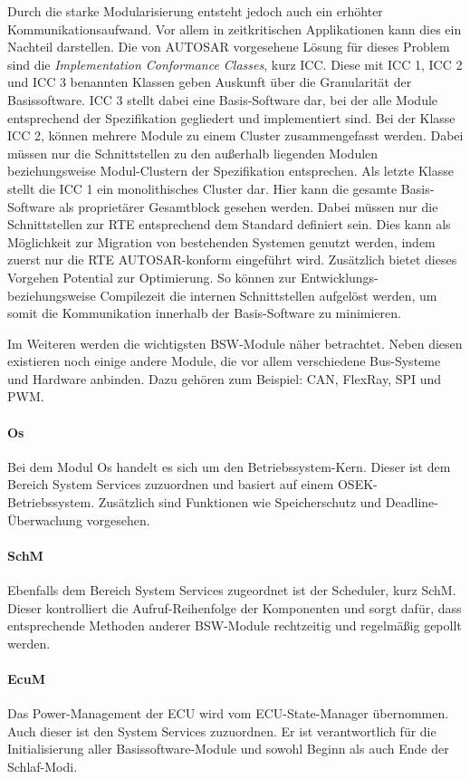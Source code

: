 \documentclass[
  a4paper,					    %
  twoside,
  DIV=calc,     				%
  bibliography=totoc,
  cleardoublepage=empty,
  ngerman,     					%
  final       					%
]{scrbook}
\begin{document}
Durch die starke Modularisierung entsteht jedoch auch ein erhöhter Kommunikationsaufwand. Vor allem in zeitkritischen Applikationen kann dies ein Nachteil darstellen. Die von AUTOSAR vorgesehene Lösung für dieses Problem sind die \emph{Implementation Conformance Classes}, kurz ICC. Diese mit ICC 1, ICC 2 und ICC 3 benannten Klassen geben Auskunft über die Granularität der Basissoftware. ICC 3 stellt dabei eine Basis-Software dar, bei der alle Module entsprechend der Spezifikation gegliedert und implementiert sind. Bei der Klasse ICC 2, können mehrere Module zu einem Cluster zusammengefasst werden. Dabei müssen nur die Schnittstellen zu den außerhalb liegenden Modulen beziehungsweise Modul-Clustern der Spezifikation entsprechen. Als letzte Klasse stellt die ICC 1 ein monolithisches Cluster dar. Hier kann die gesamte Basis-Software als proprietärer Gesamtblock gesehen werden. Dabei müssen nur die Schnittstellen zur RTE entsprechend dem Standard definiert sein. Dies kann als Möglichkeit zur Migration von bestehenden Systemen genutzt werden, indem zuerst nur die RTE AUTOSAR-konform eingeführt wird. Zusätzlich bietet dieses Vorgehen Potential zur Optimierung. So können zur Entwicklungs- beziehungsweise Compilezeit die internen Schnittstellen aufgelöst werden, um somit die Kommunikation innerhalb der Basis-Software zu minimieren.

Im Weiteren werden die wichtigsten BSW-Module näher betrachtet\cite{SE_Autosar}. Neben diesen existieren noch einige andere Module, die vor allem verschiedene Bus-Systeme und Hardware anbinden. Dazu gehören zum Beispiel: CAN, FlexRay, SPI und PWM.

\paragraph{Os}
Bei dem Modul Os handelt es sich um den Betriebssystem-Kern. Dieser ist dem Bereich System Services zuzuordnen und basiert auf einem OSEK-Betriebssystem. Zusätzlich sind Funktionen wie Speicherschutz und Deadline-Überwachung vorgesehen.

\paragraph{SchM}
Ebenfalls dem Bereich System Services zugeordnet ist der Scheduler, kurz SchM. Dieser kontrolliert die Aufruf-Reihenfolge der Komponenten und sorgt dafür, dass entsprechende Methoden anderer BSW-Module rechtzeitig und regelmäßig gepollt werden.

\paragraph{EcuM}
Das Power-Management der ECU wird vom ECU-State-Manager übernommen. Auch dieser ist den System Services zuzuordnen. Er ist verantwortlich für die Initialisierung aller Basissoftware-Module und sowohl Beginn als auch Ende der Schlaf-Modi.
\end{document}
